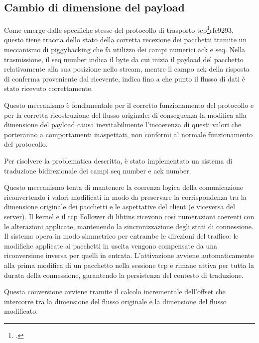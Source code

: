 \subsection{Cambio di dimensione del payload}

Come emerge dalle specifiche stesse del protocollo di trasporto \gls{tcp}\footcite{RFC9293, Transmission Control Protocol (TCP)}{rfc9293}, questo tiene traccia dello stato della corretta recezione dei pacchetti tramite un meccanismo di piggybacking che fa utilizzo dei campi numerici \gls{ack} e \gls{seq}.
Nella trasmissione, il \gls{seq} number indica il byte da cui inizia il payload del pacchetto relativamente alla sua posizione nello stream, mentre il campo \gls{ack} della risposta di conferma proveniente dal ricevente, indica fino a che punto il flusso di dati è stato ricevuto correttamente.

Questo meccanismo è fondamentale per il corretto funzionamento del protocollo e per la corretta ricostruzione del flusso originale: di conseguenza la modifica alla dimensione del payload causa inevitabilmente l'incoerenza di questi valori che porteranno a comportamenti inaspettati, non conformi al normale funzionamento del protocollo.

Per risolvere la problematica descritta, è stato implementato un sistema di traduzione bidirezionale dei campi \gls{seq} number e \gls{ack} number.

Questo meccanismo tenta di mantenere la coerenza logica della comunicazione riconvertendo i valori modificati in modo da preservare la corrispondenza tra la dimensione originale dei pacchetti e le aspettative del client (e viceversa del server).
Il kernel e il \gls{tcp} Follower di libtins ricevono così numerazioni coerenti con le alterazioni applicate, mantenendo la sincronizzazione degli stati di connessione.
Il sistema opera in modo simmetrico per entrambe le direzioni del traffico: le modifiche applicate ai pacchetti in uscita vengono compensate da una riconversione inversa per quelli in entrata. L'attivazione avviene automaticamente alla prima modifica di un pacchetto nella sessione \gls{tcp} e rimane attiva per tutta la durata della connessione, garantendo la persistenza del contesto di traduzione.

Questa conversione avviene tramite il calcolo incrementale dell'offset che intercorre tra la dimensione del flusso originale e la dimensione del flusso modificato.

